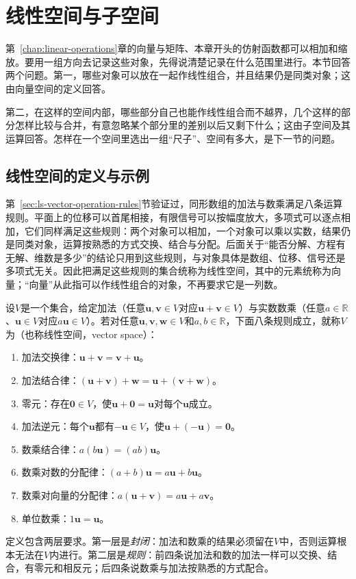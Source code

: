 
\section{线性空间与子空间}
\label{sec:ls-vector-spaces}
\label{sec:linear-algebra-vector-spaces-coordinates}

第~\ref{chap:linear-operations}章的向量与矩阵、本章开头的仿射函数都可以相加和缩放。要用一组方向去记录这些对象，先得说清楚记录在什么范围里进行。本节回答两个问题。第一，哪些对象可以放在一起作线性组合，并且结果仍是同类对象；这由向量空间的定义回答。

第二，在这样的空间内部，哪些部分自己也能作线性组合而不越界，几个这样的部分怎样比较与合并，有意忽略某个部分里的差别以后又剩下什么；这由子空间及其运算回答。怎样在一个空间里选出一组“尺子”、空间有多大，是下一节的问题。

\subsection{线性空间的定义与示例}
\label{sec:ls-space-axioms}

第~\ref{sec:ls-vector-operation-rules}节验证过，同形数组的加法与数乘满足八条运算规则。平面上的位移可以首尾相接，有限信号可以按幅度放大，多项式可以逐点相加，它们同样满足这些规则：两个对象可以相加，一个对象可以乘以实数，结果仍是同类对象，运算按熟悉的方式交换、结合与分配。后面关于“能否分解、方程有无解、维数是多少”的结论只用到这些规则，与对象具体是数组、位移、信号还是多项式无关。因此把满足这些规则的集合统称为线性空间，其中的元素统称为向量；“向量”从此指可以作线性组合的对象，不再要求它是一列数。

\begin{definition}[实线性空间]
\label{def:ls-real-vector-space}
设$V$是一个集合，给定加法（任意$\bm u,\bm v\in V$对应$\bm u+\bm v\in V$）与实数数乘（任意$a\in\mathbb R$、$\bm u\in V$对应$a\bm u\in V$）。若对任意$\bm u,\bm v,\bm w\in V$和$a,b\in\mathbb R$，下面八条规则成立，就称$V$为（也称线性空间，vector space）：
\begin{enumerate}
 \item 加法交换律：$\bm u+\bm v=\bm v+\bm u$。
 \item 加法结合律：$(\bm u+\bm v)+\bm w=\bm u+(\bm v+\bm w)$。
 \item 零元：存在$\bm0\in V$，使$\bm u+\bm0=\bm u$对每个$\bm u$成立。
 \item 加法逆元：每个$\bm u$都有$-\bm u\in V$，使$\bm u+(-\bm u)=\bm0$。
 \item 数乘结合律：$a(b\bm u)=(ab)\bm u$。
 \item 数乘对数的分配律：$(a+b)\bm u=a\bm u+b\bm u$。
 \item 数乘对向量的分配律：$a(\bm u+\bm v)=a\bm u+a\bm v$。
 \item 单位数乘：$1\bm u=\bm u$。
\end{enumerate}
\end{definition}
定义包含两层要求。第一层是\emph{封闭}：加法和数乘的结果必须留在$V$中，否则运算根本无法在$V$内进行。第二层是\emph{规则}：前四条说加法和数的加法一样可以交换、结合，有零元和相反元；后四条说数乘与加法按熟悉的方式配合。

